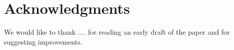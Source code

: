 \section{Acknowledgments} 

We would like to thank .... for reading
an early draft of the paper and for suggesting improvements.

